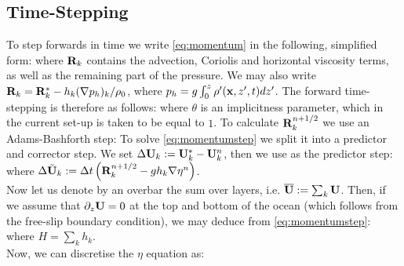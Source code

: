 \subsection{Time-Stepping}
To step forwards in time we write \cref{eq:momentum} in the following, simplified form:
where $\mathbf{R}_{k}$ contains the advection, Coriolis and horizontal viscosity terms, as well as the remaining part of the pressure. We may also write $\mathbf{R}_{k} = \mathbf{R}_{k}^{*} - h_{k}(\nabla p_{h})_{k}/\rho_{0}$, where $p_{h} = g\int_{0}^{z}\rho'(\mathbf{x},z',t) dz'$. The forward time-stepping is therefore as follows:
where $\theta$ is an implicitness parameter, which in the current set-up is taken to be equal to $1$. To calculate $\mathbf{R}_{k}^{n+1/2}$ we use an Adams-Bashforth step:
To solve \cref{eq:momentumstep} we split it into a predictor and corrector step.  We set $\Delta \mathbf{U}_{k} : = \mathbf{U}^{*}_{k} - \mathbf{U}^{n}_{k}$, then we use as the predictor step:
where $\Delta\tilde{\mathbf{U}}_{k} : = \Delta t\left(\mathbf{R}_{k}^{n+1/2} - gh_{k}\nabla\eta^{n}\right)$. \\
\linebreak
Now let us denote by an overbar the sum over layers, i.e. $\overline{\mathbf{U}}: = \sum_{k}\mathbf{U}$. Then, if we assume that $\partial_{z}\mathbf{U} = 0$ at the top and bottom of the ocean (which follows from the free-slip boundary condition), we may deduce from \cref{eq:momentumstep}:
where $H = \sum_{k} h_{k}$. \\
\linebreak
Now, we can discretise the $\eta$ equation as:
